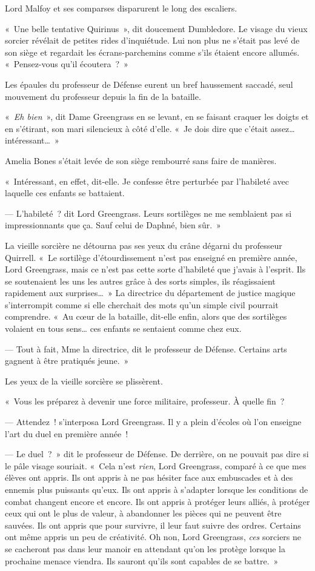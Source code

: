 Lord Malfoy et ses comparses disparurent le long des escaliers.

«~Une belle tentative Quirinus~», dit doucement Dumbledore. Le visage du vieux sorcier révélait de petites rides d'inquiétude. Lui non plus ne s'était pas levé de son siège et regardait les écrans-parchemins comme s'ils étaient encore allumés. «~Pensez-vous qu'il écoutera~?~»

Les épaules du professeur de Défense eurent un bref haussement saccadé, seul mouvement du professeur depuis la fin de la bataille.

«~\emph{Eh bien}~», dit Dame Greengrass en se levant, en se faisant craquer les doigts et en s'étirant, son mari silencieux à côté d'elle. «~Je dois dire que c'était assez… intéressant…~»

Amelia Bones s'était levée de son siège rembourré sans faire de manières.

«~Intéressant, en effet, dit-elle. Je confesse être perturbée par l'habileté avec laquelle ces enfants se battaient.

--- L'habileté~? dit Lord Greengrass. Leurs sortilèges ne me semblaient pas si impressionnants que ça. Sauf celui de Daphné, bien sûr.~»

La vieille sorcière ne détourna pas ses yeux du crâne dégarni du professeur Quirrell. «~Le sortilège d'étourdissement n'est pas enseigné en première année, Lord Greengrass, mais ce n'est pas cette sorte d'habileté que j'avais à l'esprit. Ils se soutenaient les uns les autres grâce à des sorts simples, ils réagissaient rapidement aux surprises…~» La directrice du département de justice magique s'interrompit comme si elle cherchait des mots qu'un simple civil pourrait comprendre. «~Au cœur de la bataille, dit-elle enfin, alors que des sortilèges volaient en tous sens… ces enfants se sentaient comme chez eux.

--- Tout à fait, Mme la directrice, dit le professeur de Défense. Certains arts gagnent à être pratiqués jeune.~»

Les yeux de la vieille sorcière se plissèrent.

«~Vous les préparez à devenir une force militaire, professeur. À quelle fin~?

--- Attendez~! s'interposa Lord Greengrass. Il y a plein d'écoles où l'on enseigne l'art du duel en première année~!

--- Le duel~?~» dit le professeur de Défense. De derrière, on ne pouvait pas dire si le pâle visage souriait. «~Cela n'est \emph{rien}, Lord Greengrass, comparé à ce que mes élèves ont appris. Ils ont appris à ne pas hésiter face aux embuscades et à des ennemis plus puissants qu'eux. Ils ont appris à s'adapter lorsque les conditions de combat changent encore et encore. Ils ont appris à protéger leurs alliés, à protéger ceux qui ont le plus de valeur, à abandonner les pièces qui ne peuvent être sauvées. Ils ont appris que pour survivre, il leur faut suivre des ordres. Certains ont même appris un peu de créativité. Oh non, Lord Greengrass, \emph{ces} sorciers ne se cacheront pas dans leur manoir en attendant qu'on les protège lorsque la prochaine menace viendra. Ils sauront qu'ils sont capables de se battre.~»

